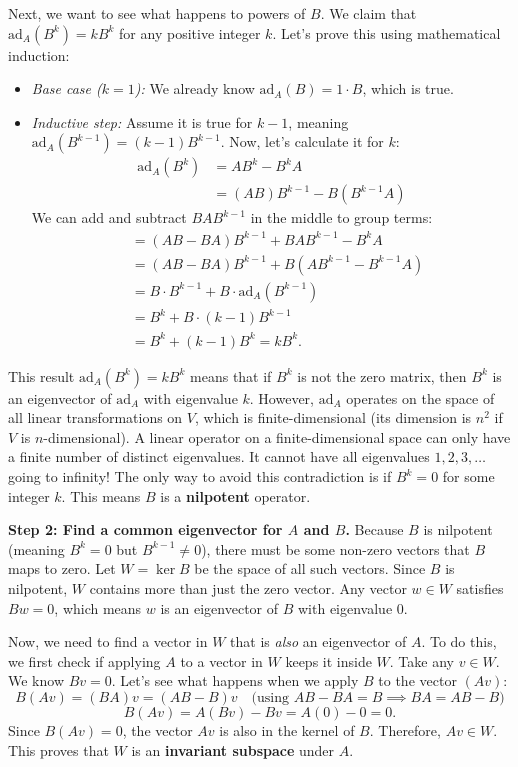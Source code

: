 \begin{solution}
Next, we want to see what happens to powers of $B$. We claim that $\text{ad}_A(B^k) = k B^k$ for any positive integer $k$. Let's prove this using mathematical induction:
\begin{itemize}
    \item \textit{Base case ($k=1$):} We already know $\text{ad}_A(B) = 1 \cdot B$, which is true.
    \item \textit{Inductive step:} Assume it is true for $k-1$, meaning $\text{ad}_A(B^{k-1}) = (k-1)B^{k-1}$. Now, let's calculate it for $k$:
    \begin{align*}
    \text{ad}_A(B^k) &= AB^k - B^k A \\
    &= (AB)B^{k-1} - B(B^{k-1}A) 
    \end{align*}
    We can add and subtract $BAB^{k-1}$ in the middle to group terms:
    \begin{align*}
    &= (AB - BA)B^{k-1} + BA B^{k-1} - B^{k}A \\
    &= (AB - BA)B^{k-1} + B(AB^{k-1} - B^{k-1}A) \\
    &= B \cdot B^{k-1} + B \cdot \text{ad}_A(B^{k-1}) \\
    &= B^k + B \cdot (k-1)B^{k-1} \\
    &= B^k + (k-1)B^k = k B^k.
    \end{align*}
\end{itemize}
This result $\text{ad}_A(B^k) = k B^k$ means that if $B^k$ is not the zero matrix, then $B^k$ is an eigenvector of $\text{ad}_A$ with eigenvalue $k$. 
However, $\text{ad}_A$ operates on the space of all linear transformations on $V$, which is finite-dimensional (its dimension is $n^2$ if $V$ is $n$-dimensional). A linear operator on a finite-dimensional space can only have a finite number of distinct eigenvalues. It cannot have all eigenvalues $1, 2, 3, \dots$ going to infinity!
The only way to avoid this contradiction is if $B^k = 0$ for some integer $k$. This means $B$ is a \textbf{nilpotent} operator.

\textbf{Step 2: Find a common eigenvector for $A$ and $B$.}
Because $B$ is nilpotent (meaning $B^k = 0$ but $B^{k-1} \neq 0$), there must be some non-zero vectors that $B$ maps to zero. Let $W = \ker B$ be the space of all such vectors. Since $B$ is nilpotent, $W$ contains more than just the zero vector.
Any vector $w \in W$ satisfies $Bw = 0$, which means $w$ is an eigenvector of $B$ with eigenvalue $0$.

Now, we need to find a vector in $W$ that is \textit{also} an eigenvector of $A$. To do this, we first check if applying $A$ to a vector in $W$ keeps it inside $W$. Take any $v \in W$. We know $Bv = 0$. Let's see what happens when we apply $B$ to the vector $(Av)$:
\[ B(Av) = (BA)v = (AB - B)v \quad \text{(using } AB - BA = B \implies BA = AB - B) \]
\[ B(Av) = A(Bv) - Bv = A(0) - 0 = 0. \]
Since $B(Av) = 0$, the vector $Av$ is also in the kernel of $B$. Therefore, $Av \in W$. This proves that $W$ is an \textbf{invariant subspace} under $A$.


\end{solution}
